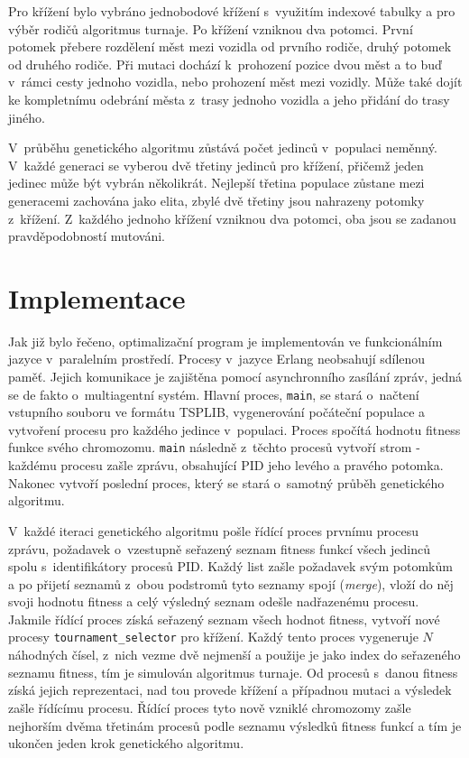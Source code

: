 \documentclass[a4paper]{article}
\begin{document}
Pro křížení bylo vybráno jednobodové křížení s~využitím indexové tabulky a pro výběr rodičů algoritmus turnaje. Po křížení vzniknou dva potomci. První potomek přebere rozdělení měst mezi vozidla od prvního rodiče, druhý potomek od druhého rodiče. Při mutaci dochází k~prohození pozice dvou měst a to buď v~rámci cesty jednoho vozidla, nebo prohození měst mezi vozidly. Může také dojít ke kompletnímu odebrání města z~trasy jednoho vozidla a jeho přidání do trasy jiného.

V~průběhu genetického algoritmu zůstává počet jedinců v~populaci neměnný. V~každé generaci se vyberou dvě třetiny jedinců pro křížení, přičemž jeden jedinec může být vybrán několikrát. Nejlepší třetina populace zůstane mezi generacemi zachována jako elita, zbylé dvě třetiny jsou nahrazeny potomky z~křížení. Z~každého jednoho křížení vzniknou dva potomci, oba jsou se zadanou pravděpodobností mutováni.

\section{Implementace}
Jak již bylo řečeno, optimalizační program je implementován ve funkcionálním jazyce v~paralelním prostředí. Procesy v~jazyce Erlang neobsahují sdílenou paměť. Jejich komunikace je zajištěna pomocí asynchronního zasílání zpráv, jedná se de fakto o~multiagentní systém. Hlavní proces, {\tt main}, se stará o~načtení vstupního souboru ve formátu TSPLIB, vygenerování počáteční populace a vytvoření procesu pro každého jedince v~populaci. Proces spočítá hodnotu fitness funkce svého chromozomu. {\tt main} následně z~těchto procesů vytvoří strom - každému procesu zašle zprávu, obsahující PID jeho levého a pravého potomka. Nakonec vytvoří poslední proces, který se stará o~samotný průběh genetického algoritmu.

V~každé iteraci genetického algoritmu pošle řídící proces prvnímu procesu zprávu, požadavek o~vzestupně seřazený seznam fitness funkcí všech jedinců spolu s~identifikátory procesů PID. Každý list zašle požadavek svým potomkům a po přijetí seznamů z~obou podstromů tyto seznamy spojí (\emph{merge}), vloží do něj svoji hodnotu fitness a celý výsledný seznam odešle nadřazenému procesu. Jakmile řídící proces získá seřazený seznam všech hodnot fitness, vytvoří nové procesy {\tt tournament\_selector} pro křížení. Každý tento proces vygeneruje $N$ náhodných čísel, z~nich vezme dvě nejmenší a použije je jako index do seřazeného seznamu fitness, tím je simulován algoritmus turnaje. Od procesů s~danou fitness získá jejich reprezentaci, nad tou provede křížení a případnou mutaci a výsledek zašle řídícímu procesu. Řídící proces tyto nově vzniklé chromozomy zašle nejhorším dvěma třetinám procesů podle seznamu výsledků fitness funkcí a tím je ukončen jeden krok genetického algoritmu.
\end{document}
